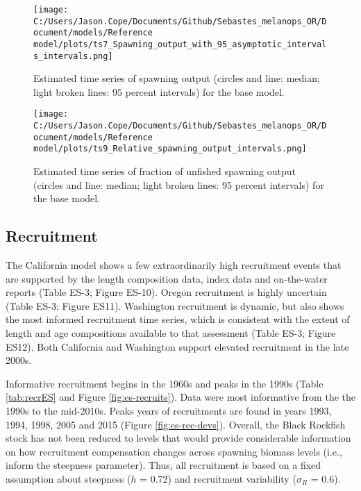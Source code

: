 \documentclass[11pt,
  english,
  letterpaper,
]{article}
\begin{document}


\begin{figure}
\centering
\texttt{[image: C:/Users/Jason.Cope/Documents/Github/Sebastes\_melanops\_OR/Document/models/Reference model/plots/ts7\_Spawning\_output\_with\_95\_asymptotic\_intervals\_intervals.png]}
\caption{Estimated time series of spawning output (circles and line: median; light broken lines: 95 percent intervals) for the base model.\label{fig:es-ssb}}
\end{figure}

\begin{figure}
\centering
\texttt{[image: C:/Users/Jason.Cope/Documents/Github/Sebastes\_melanops\_OR/Document/models/Reference model/plots/ts9\_Relative\_spawning\_output\_intervals.png]}
\caption{Estimated time series of fraction of unfished spawning output (circles and line: median; light broken lines: 95 percent intervals) for the base model.\label{fig:es-depl}}
\end{figure}

\clearpage

\hypertarget{recruitment}{%
\subsection*{Recruitment}\label{recruitment}}

The California model shows a few extraordinarily high recruitment events that are supported by the length composition data, index data and on-the-water reports (Table ES-3; Figure ES-10). Oregon recruitment is highly uncertain (Table ES-3; Figure ES11). Washington recruitment is dynamic, but also shows the most informed recruitment time series, which is consistent with the extent of length and age compositions available to that assessment (Table ES-3; Figure ES12). Both California and Washington support elevated recruitment in the late 2000s.

Informative recruitment begins in the 1960s and peaks in the 1990s (Table \ref{tab:recrES} and Figure \ref{fig:es-recruits}). Data were most informative from the the 1990s to the mid-2010s. Peaks years of recruitments are found in years 1993, 1994, 1998, 2005 and 2015 (Figure \ref{fig:es-rec-devs}). Overall, the Black Rockfish stock has not been reduced to levels that would provide considerable information on how recruitment compensation changes across spawning biomass levels (i.e., inform the steepness parameter). Thus, all recruitment is based on a fixed assumption about steepness (\(h\) = 0.72) and recruitment variability (\(\sigma_R\) = 0.6).
\end{document}
